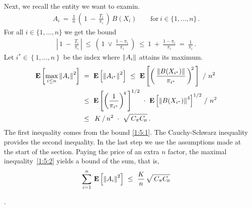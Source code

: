 Next, we recall the entity we want to examin.
\begin{gather*}
  A_i
  \ 
  =
  \ 
  \frac{1}{n}
  \,
  \left( 
    \,
    1
    \ 
    -
    \ 
    \frac{T_i}{\pi_i}
    \,
  \right)
  \,
  B(X_i)
  \qquad
  \text{for}
  \ 
  i\in \{1, \ldots, n\}\,.
\end{gather*}
For all
$
  i\in \{1, \ldots, n\}
$
we get the bound
\begin{gather}
  \label{1:5:1}
  \left| 
    \,
    1
    \ 
    -
    \ 
    \frac{T_i}{\pi_i}
    \,
  \right|
  \ 
  \le
  \ 
  \left( 
    \,
  1
  \ 
  \lor
  \ 
  \frac{1-\pi_i}{\pi_i}
  \,
  \right)
  \ 
  \le
  \ 
  1
  \ 
  +
  \ 
  \frac{1-\pi_i}{\pi_i}
  \ 
  =
  \ 
  \frac{1}{\pi_i}
  \,.
\end{gather}
Let
$i^*\in \left\{ 1, \ldots, n \right\}$
be the index where 
$
\left\lVert A_i\right\rVert
$
attains its maximum.
\begin{align}
  \label{1:5:2}
  \begin{split}
  \E\left[\max_{i \le n}\norm{A_i}^2\right]
  &
  \ 
  =
  \ 
  \E\left[\norm{A_{i^*}}^2\right]
  \ 
  \le
  \ 
  \E \left[ 
    \left(
      \,
      \frac{
    \norm{B(X_{i^*})}
      }{\pi_{i^*}}
      \,
    \right)
    ^{\!2}
    \,
  \right]
  \ 
  /
  \ 
  n^2
  \\
  &
    \ 
  \le
  \ 
  \E \left[ 
    \left(
      \frac{1}{\pi_{i^*}}
    \right)^{\!4}
    \,
  \right]^{1/2}
  \ 
  \cdot
  \ 
  \E\left[
    \norm{B(X_{i^*})}^4
  \right]^{1/2}
  \,
  /
  \ 
  n^2
  \\
  &
  \ 
  \le
  \ 
  \,
  K
  \,
  /
  \,
  n^2
  \ 
  \cdot
  \ 
  \sqrt{
    \,
    C_\pi
    C_{\!\scriptscriptstyle B}
  }
  \,.
\end{split}
\end{align}
The first inequality comes from the bound \eqref{1:5:1}.
The Cauchy-Schwarz inequality provides the second inequality.
In the last step we use the assumptions made at the start of the section. 
Paying the price of an extra $n$ factor, the 
maximal inequality~\eqref{1:5:2}
yields a bound of the sum, that is,
\begin{gather}
  \sum_{i=1}^{n}
  \,
  \E\left[\norm{A_i}^2\right]
  \ 
  \le
  \ 
  \frac{K}{n}
  \,
  \sqrt{\,C_\pi 
    C_{\!\scriptscriptstyle B}
  }
\end{gather}
\begin{assumption}
  .
\end{assumption}
 
